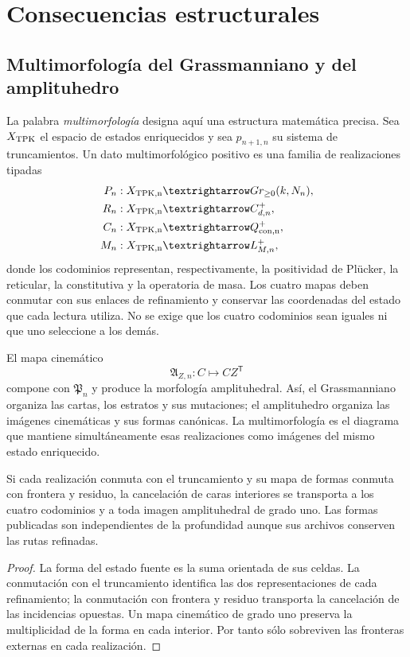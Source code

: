 \section{Consecuencias estructurales}

\subsection{Multimorfología del Grassmanniano y del amplituhedro}

La palabra \emph{multimorfología} designa aquí una estructura matemática
precisa. Sea \(\widehat{\mathcal X}_{\rm TPK}\) el espacio de estados
enriquecidos y sea \(p_{n+1,n}\) su sistema de truncamientos. Un dato
multimorfológico positivo es una familia de realizaciones tipadas
\[
\begin{aligned}
\mathfrak P_n&:\widehat{\mathcal X}_{\rm TPK,n}
 \longrightarrow \operatorname{Gr}_{\geq0}(k,N_n),\\
\mathfrak R_n&:\widehat{\mathcal X}_{\rm TPK,n}
 \longrightarrow C^{+}_{d,n},\\
\mathfrak C_n&:\widehat{\mathcal X}_{\rm TPK,n}
 \longrightarrow \mathcal Q^{+}_{\rm con,n},\\
\mathfrak M_n&:\widehat{\mathcal X}_{\rm TPK,n}
 \longrightarrow \mathcal L^{+}_{M,n},
\end{aligned}
\]
donde los codominios representan, respectivamente, la positividad de
Plücker, la reticular, la constitutiva y la operatoria de masa. Los cuatro
mapas deben conmutar con sus enlaces de refinamiento y conservar las
coordenadas del estado que cada lectura utiliza. No se exige que los cuatro
codominios sean iguales ni que uno seleccione a los demás.

El mapa cinemático
\[
\mathfrak A_{Z,n}:C\longmapsto CZ^{\mathsf T}
\]
compone con \(\mathfrak P_n\) y produce la morfología amplituhedral. Así, el
Grassmanniano organiza las cartas, los estratos y sus mutaciones; el
amplituhedro organiza las imágenes cinemáticas y sus formas canónicas. La
multimorfología es el diagrama que mantiene simultáneamente esas realizaciones
como imágenes del mismo estado enriquecido.

\begin{proposition}
\label{geometria_positiva:prop:coherencia-multimorfologica}
Si cada realización conmuta con el truncamiento y su mapa de formas conmuta
con frontera y residuo, la cancelación de caras interiores se transporta a
los cuatro codominios y a toda imagen amplituhedral de grado uno. Las formas
publicadas son independientes de la profundidad aunque sus archivos conserven
las rutas refinadas.
\end{proposition}
\begin{proof}
La forma del estado fuente es la suma orientada de sus celdas. La conmutación
con el truncamiento identifica las dos representaciones de cada refinamiento;
la conmutación con frontera y residuo transporta la cancelación de las
incidencias opuestas. Un mapa cinemático de grado uno preserva la multiplicidad
de la forma en cada interior. Por tanto sólo sobreviven las fronteras externas
en cada realización.
\end{proof}


